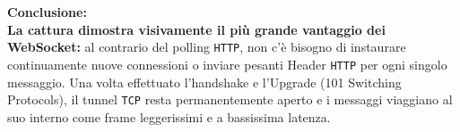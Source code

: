 \documentclass[11pt]{article}
\begin{document}
\begin{tcolorbox}[colback=green!5!white,colframe=green!75!black,title=\textbf{RISPOSTA}, breakable]
\textbf{Conclusione:}\\
\textbf{La cattura dimostra visivamente il più grande vantaggio dei WebSocket:} al contrario del polling \texttt{HTTP}, non c'è bisogno di instaurare continuamente nuove connessioni o inviare pesanti Header \texttt{HTTP} per ogni singolo messaggio. Una volta effettuato l'handshake e l'Upgrade (101 Switching Protocols), il tunnel \texttt{TCP} resta permanentemente aperto e i messaggi viaggiano al suo interno come frame leggerissimi e a bassissima latenza.
\end{tcolorbox}
\end{document}
